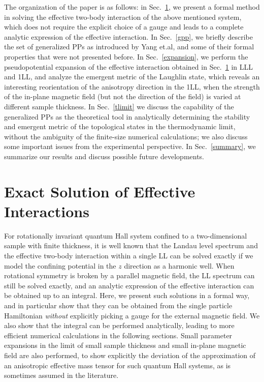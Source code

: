 \documentclass[twocolumn,showpacs,amsmath,amstex,amssymb,mathfonts,prb]{revtex4-1}
\begin{document}
The organization of the paper is as follows: in Sec.~\ref{exactsolutions}, we present a formal method in solving the effective two-body interaction of the above mentioned system, which does not require the explicit choice of a gauge and leads to a complete analytic expression of the effective interaction. In Sec.~\ref{gpp}, we briefly describe the set of generalized PPs as introduced by Yang et.al\cite{yang2}, and some of their formal properties that were not presented before. In Sec.~\ref{expansion}, we perform the pseudopotential expansion of the effective interaction obtained in Sec.~\ref{exactsolutions} in LLL and 1LL, and analyze the emergent metric of the Laughlin state, which reveals an interesting reorientation of the anisotropy direction in the 1LL, when the strength of the in-plane magnetic field (but not the direction of the field) is varied at different sample thickness. In Sec.~\ref{tlimit} we discuss the capability of the generalized PPs as the theoretical tool in analytically determining the stability and emergent metric of the topological states in the thermodynamic limit, without the ambiguity of the finite-size numerical calculations; we also discuss some important issues from the experimental perspective. In Sec.~\ref{summary}, we summarize our results and discuss possible future developments.

\section{Exact Solution of Effective Interactions}\label{exactsolutions}

For rotationally invariant quantum Hall system confined to a two-dimensional sample with finite thickness, it is well known that the Landau level spectrum and the effective two-body interaction within a single LL can be solved exactly if we model the confining potential in the $z$ direction as a harmonic well. When rotational symmetry is broken by a parallel magnetic field, the LL spectrum can still be solved exactly\cite{maan,chakraborty}, and an analytic expression of the effective interaction can be obtained up to an integral\cite{zlatko}. Here, we present such solutions in a formal way, and in particular show that they can be obtained from the single particle Hamiltonian \emph{without} explicitly picking a gauge for the external magnetic field. We also show that the integral can be performed analytically, leading to more efficient numerical calculations in the following sections. Small parameter expansions in the limit of small sample thickness and small in-plane magnetic field are also performed, to show explicitly the deviation of the approximation of an anisotropic effective mass tensor for such quantum Hall systems, as is sometimes assumed in the literature\cite{yang1}. 
\end{document}

